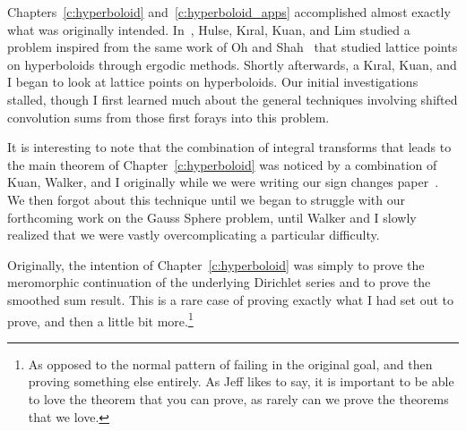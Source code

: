 Chapters~\ref{c:hyperboloid} and~\ref{c:hyperboloid_apps} accomplished almost exactly what
was originally intended.
In~\cite{hulseCountingSquare}, Hulse, K{\i}ral, Kuan, and Lim studied a problem
inspired from the same work of Oh and Shah~\cite{ohshah2014} that studied lattice points
on hyperboloids through ergodic methods.
Shortly afterwards, a K{\i}ral, Kuan, and I began to look at lattice points on
hyperboloids.
Our initial investigations stalled, though I first learned much about the general
techniques involving shifted convolution sums from those first forays into this problem.


It is interesting to note that the combination of integral transforms that leads to the
main theorem of Chapter~\ref{c:hyperboloid} was noticed by a combination of Kuan, Walker,
and I originally while we were writing our sign changes paper~\cite{hkldwSigns}.
We then forgot about this technique until we began to struggle with our forthcoming
work on the Gauss Sphere problem, until Walker and I slowly realized that we were
vastly overcomplicating a particular difficulty.


Originally, the intention of Chapter~\ref{c:hyperboloid} was simply to prove the
meromorphic continuation of the underlying Dirichlet series and to prove the smoothed sum
result.
This is a rare case of proving exactly what I had set out to prove, and then a little
bit more.\footnote{As opposed to the normal pattern of failing in the original goal, and
  then proving something else entirely.
  As Jeff likes to say, it is important to be able to love the theorem that you can prove,
as rarely can we prove the theorems that we love.}





